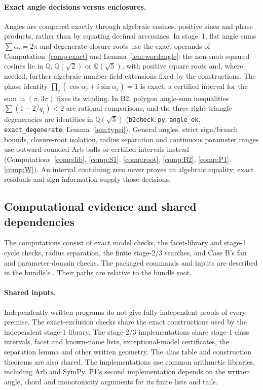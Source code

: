 \documentclass[11pt]{article}
\theoremstyle{definition}
\theoremstyle{remark}
\newcommand{\Q}{\mathbb{Q}}
\newcommand{\file}[1]{\path{#1}}
\begin{document}
\paragraph{Exact angle decisions versus enclosures.}
Angles are compared exactly through algebraic cosines, positive sines and
phase products, rather than by equating decimal arccosines. In stage~1,
flat angle sums $\sum\alpha_i=2\pi$ and degenerate closure roots use the
exact operands of Computation~\ref{comp:exact} and
Lemma~\ref{lem:wordangle}: the non-snub squared cosines lie in
$\Q$, $\Q(\sqrt2)$ or $\Q(\sqrt5)$, with positive square roots and,
where needed, further algebraic number-field extensions fixed by the
constructions. The phase identity
$\prod_j(\cos\alpha_j+i\sin\alpha_j)=1$ is exact; a certified interval
for the sum in $(\pi,3\pi)$ fixes its winding. In B2, polygon angle-sum
inequalities $\sum(1-2/q_i)<2$ are rational comparisons, and the three
right-triangle degeneracies are identities in $\Q(\sqrt5)$
(\texttt{b2check.py}, \texttt{angle\_ok}, \texttt{exact\_degenerate};
Lemma~\ref{lem:typei}). General angles, strict sign/branch bounds,
closure-root isolation, radius separation and continuous parameter ranges
use outward-rounded Arb balls or certified intervals instead
(Computations~\ref{comp:lib}, \ref{comp:S1}, \ref{comp:root},
\ref{comp:B2}, \ref{comp:P1}, \ref{comp:W}). An interval containing zero
never proves an algebraic equality; exact residuals and sign information
supply those decisions.

\subsection{Computational evidence and shared dependencies}\label{sec:computations}

The computations consist of exact model checks, the facet-library and
stage-1 cycle checks, radius separation, the finite stage-2/3 searches,
and Case B's fan and parameter-domain checks. The packaged commands and
inputs are described in the bundle's \file{README.md}. Their paths are
relative to the bundle root.

\paragraph{Shared inputs.}
Independently written programs do not give fully independent proofs of
every premise. The exact-exclusion checks share the exact constructions
used by the independent stage-1 library. The stage-2/3 implementations
share stage-1 class intervals, facet and known-name lists, exceptional-model
certificates, the separation lemma and other written geometry. The alias
table and construction theorems are also shared. The implementations use
common arithmetic libraries, including Arb and SymPy. P1's second
implementation depends on the written angle, chord and monotonicity
arguments for its finite lists and tails.
\end{document}
